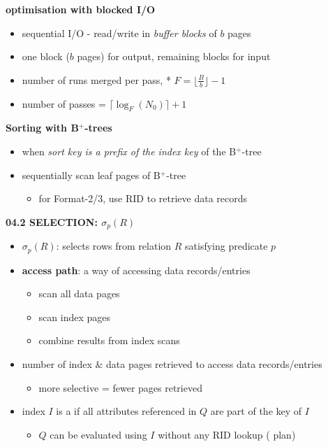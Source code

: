 \documentclass[8pt, landscape]{extarticle}
\begin{document}
\begin{multicols*}{4}
  \textbf{optimisation with blocked I/O}

  \begin{itemize}
    \item sequential I/O - read/write in \textit{buffer blocks} of $b$ pages
    \item one block ($b$ pages) for output, remaining blocks for input
    \item number of runs merged per pass, * $F = \lfloor \frac{B}{b} \rfloor -1$ 
    \item number of passes = $\lceil \log_F(N_0) \rceil +1$
  \end{itemize}
  
  \textbf{Sorting with B$^+$-trees}

  \begin{itemize}
    \item when \textit{sort key is a prefix of the index key} of the B$^+$-tree
    \item sequentially scan leaf pages of B$^+$-tree
      \begin{itemize}
        \item for Format-2/3, use RID to retrieve data records
      \end{itemize}
  \end{itemize}

  \textbf{04.2 SELECTION: $\sigma_p(R)$}

  \begin{itemize}
    \item $\sigma_p(R)$: selects rows from relation $R$ satisfying predicate $p$
    \item \textbf{access path}: a way of accessing data records/entries 
      \begin{itemize}
        \item {} scan all data pages
        \item {} scan index pages
        \item {} combine results from index scans 
      \end{itemize}
    \item {} number of index \& data pages retrieved to access data records/entries
      \begin{itemize}
        \item more selective = fewer pages retrieved
      \end{itemize}
    \item index $I$ is a  if all attributes referenced in $Q$ are part of the key of $I$ 
      \begin{itemize}
        \item $Q$ can be evaluated using $I$ without any RID lookup ( plan)
      \end{itemize}
  \end{itemize}


\end{multicols*}
\end{document}
